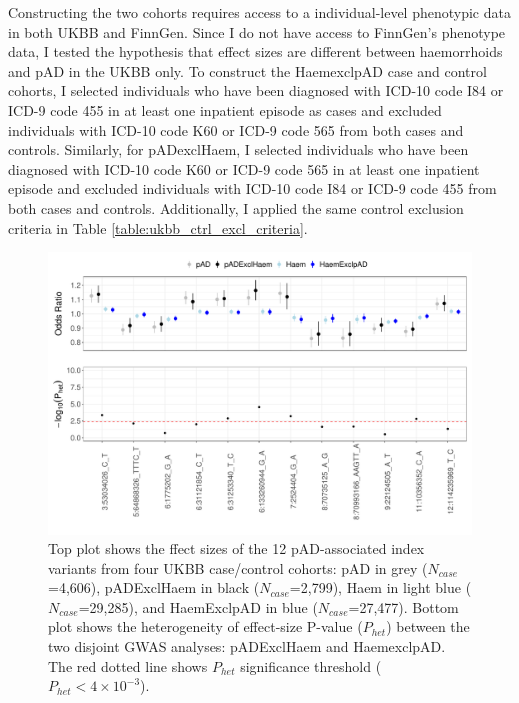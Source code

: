 Constructing the two cohorts requires access to a individual-level phenotypic data in both UKBB and FinnGen. Since I do not have access to FinnGen's phenotype data, I tested the hypothesis that effect sizes are different between haemorrhoids and pAD in the UKBB only. To construct the HaemexclpAD case and control cohorts, I selected individuals who have been diagnosed with ICD-10 code I84 or ICD-9 code 455 in at least one inpatient episode as cases and excluded individuals with ICD-10 code K60 or ICD-9 code 565 from both cases and controls. Similarly, for pADexclHaem, I selected individuals who have been diagnosed with ICD-10 code K60 or ICD-9 code 565 in at least one inpatient episode and excluded individuals with ICD-10 code I84 or ICD-9 code 455 from both cases and controls. Additionally, I applied the same control exclusion criteria in Table \ref{table:ukbb_ctrl_excl_criteria}. 

\begin{figure}[H]
  \centering    
  \includegraphics[width=1.0\textwidth]{combined_forest_het_plt}
  \caption[Effect sizes of the 12 pAD-associated index variants on haemorrhoids and pAD]{Top plot shows the ffect sizes of the 12 pAD-associated index variants from four UKBB case/control cohorts: pAD in grey ($N_{case}$=4,606), pADExclHaem in black ($N_{case}$=2,799), Haem in light blue ($N_{case}$=29,285), and HaemExclpAD in blue ($N_{case}$=27,477). Bottom plot shows the heterogeneity of effect-size P-value ($P_{het}$) between the two disjoint GWAS analyses: pADExclHaem and HaemexclpAD. The red dotted line shows $P_{het}$ significance threshold ($P_{het} < 4\times10^{-3}$).}
  \label{fig:combined_forest_het_plot}
  \end{figure}

